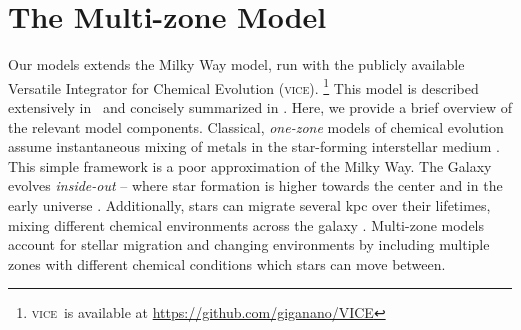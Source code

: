 \documentclass[fleqn,
usenatbib]{mnras}
\newcommand{\JJ}{\citetalias{james+21}}
\newcommand{\VICE}{\textsc{vice}}
\begin{document}
\section{The Multi-zone Model}\label{sec:vice}

Our models extends the \citet[hereafter \JJ]{james+21} Milky Way model, run with the publicly available Versatile Integrator for Chemical Evolution (\VICE).%
    \footnote{\VICE~is available at \url{https://github.com/giganano/VICE}}
This model is described extensively in \JJ~and concisely summarized  in \citet{james+23}. Here, we provide a brief overview of the relevant model components.
Classical, \textit{one-zone} models of chemical evolution assume instantaneous mixing of metals in the star-forming interstellar medium \citep[e.g.][]{matteucci21}. This simple framework is a poor approximation of the Milky Way.  The Galaxy evolves \textit{inside-out} -- where star formation is higher towards the center and in the early universe \citep{bird+13}. Additionally, stars can migrate several kpc over their lifetimes, mixing different chemical environments across the galaxy \citep{bird+12,sellwood+binney02}. Multi-zone models account for stellar migration and changing environments by including multiple zones with different chemical conditions which stars can move between.
\end{document}
